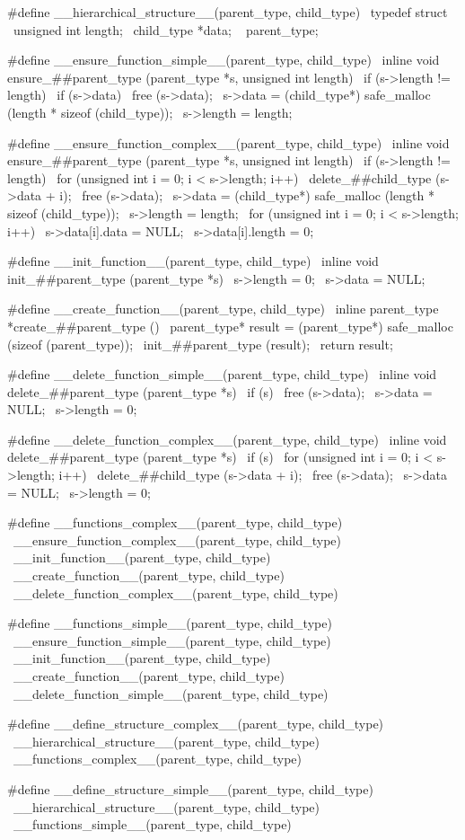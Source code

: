 \documentclass{article}
\begin{document}
\begin{ccode}
#define __hierarchical_structure__(parent_type, child_type) \
typedef struct { \
  unsigned int length; \
  child_type *data; \
} parent_type;

#define __ensure_function_simple__(parent_type, child_type) \
inline void ensure_##parent_type (parent_type *s, unsigned int length) { \
  if (s->length != length) { \
   if (s->data) \
      free (s->data); \
   s->data = (child_type*) safe_malloc (length * sizeof (child_type)); \
   s->length = length; \
  } \
}

#define __ensure_function_complex__(parent_type, child_type) \
inline void ensure_##parent_type (parent_type *s, unsigned int length) { \
  if (s->length != length) { \
   for (unsigned int i = 0; i < s->length; i++) \
      delete_##child_type (s->data + i); \
   free (s->data); \
   s->data = (child_type*) safe_malloc (length * sizeof (child_type)); \
   s->length = length; \
   for (unsigned int i = 0; i < s->length; i++) { \
      s->data[i].data = NULL; \
      s->data[i].length = 0; \
   } \
  } \
}

#define __init_function__(parent_type, child_type) \
inline void init_##parent_type (parent_type *s) { \
  s->length = 0; \
  s->data = NULL; \
}

#define __create_function__(parent_type, child_type) \
inline parent_type *create_##parent_type () { \
  parent_type* result = (parent_type*) safe_malloc (sizeof (parent_type)); \
  init_##parent_type (result); \
  return result; \
}

#define __delete_function_simple__(parent_type, child_type) \
inline void delete_##parent_type (parent_type *s) { \
  if (s) { \
   free (s->data); \
   s->data = NULL; \
   s->length = 0; \
  } \
}

#define __delete_function_complex__(parent_type, child_type) \
inline void delete_##parent_type (parent_type *s) { \
  if (s) { \
   for (unsigned int i = 0; i < s->length; i++) \
      delete_##child_type (s->data + i); \
   free (s->data); \
   s->data = NULL; \
   s->length = 0; \
  } \
}

#define __functions_complex__(parent_type, child_type) \
__ensure_function_complex__(parent_type, child_type) \
__init_function__(parent_type, child_type) \
__create_function__(parent_type, child_type) \
__delete_function_complex__(parent_type, child_type)

#define __functions_simple__(parent_type, child_type) \
__ensure_function_simple__(parent_type, child_type) \
__init_function__(parent_type, child_type) \
__create_function__(parent_type, child_type) \
__delete_function_simple__(parent_type, child_type)

#define __define_structure_complex__(parent_type, child_type) \
__hierarchical_structure__(parent_type, child_type) \
__functions_complex__(parent_type, child_type)

#define __define_structure_simple__(parent_type, child_type) \
__hierarchical_structure__(parent_type, child_type) \
__functions_simple__(parent_type, child_type)
\end{ccode}
\end{document}
